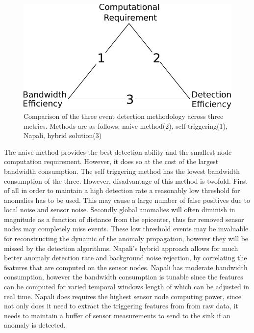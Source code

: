 \begin{figure}[h]
	  \centering
	  \includegraphics[width=0.5\linewidth]{img/edge_computing_vs.pdf}
	\caption{Comparison of the three event detection methodology across three metrics. Methods are as follows: naive method(2), self triggering(1), Napali, hybrid solution(3)}
	\label{intro:fig:edge}
\end{figure}
The naive method provides the best detection ability and the smallest node computation requirement. However, it does so at the cost of the largest bandwidth consumption. The self triggering method has the lowest bandwidth consumption of the three. However, disadvantage of this method is twofold. First of all in order to maintain a high detection rate a reasonably low threshold for anomalies has to be used. This may cause a large number of false positives due to local noise and sensor noise. Secondly global anomalies will often diminish in magnitude as a function of distance from the epicenter, thus far removed sensor nodes may completely miss events. These low threshold events may be invaluable for reconstructing the dynamic of the anomaly propagation, however they will be missed by the detection algorithms. Napali's hybrid approach allows for much better anomaly detection rate and background noise rejection, by correlating the features that are computed on the sensor nodes. Napali has moderate bandwidth consumption, however the bandwidth consumption is tunable since the features can be computed for varied temporal windows length of which can be adjusted in real time. Napali does requires the highest sensor node computing power, since not only does it need to extract the triggering features from from raw data, it needs to maintain a buffer of sensor measurements to send to the sink if an anomaly is detected.

